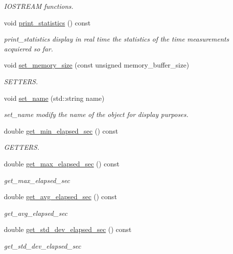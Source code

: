 \begin{DoxyCompactItemize}
\begin{DoxyCompactList}\small\item\em I\+O\+S\+T\+R\+E\+AM functions. \end{DoxyCompactList}\item 
\mbox{\label{classreal__time__tools_1_1Timer_a16635bb883c6f71772093a89cbe3130a}} 
void \hyperlink{classreal__time__tools_1_1Timer_a16635bb883c6f71772093a89cbe3130a}{print\+\_\+statistics} () const
\begin{DoxyCompactList}\small\item\em print\+\_\+statistics display in real time the statistics of the time measurements acquiered so far. \end{DoxyCompactList}\item 
void \hyperlink{classreal__time__tools_1_1Timer_a0319fbdc56fd5046d701c8728b27e860}{set\+\_\+memory\+\_\+size} (const unsigned memory\+\_\+buffer\+\_\+size)
\begin{DoxyCompactList}\small\item\em S\+E\+T\+T\+E\+RS. \end{DoxyCompactList}\item 
void \hyperlink{classreal__time__tools_1_1Timer_a1005cc3c2d7e68ab6d97c8d3167c7f93}{set\+\_\+name} (std\+::string name)
\begin{DoxyCompactList}\small\item\em set\+\_\+name modify the name of the object for display purposes. \end{DoxyCompactList}\item 
double \hyperlink{classreal__time__tools_1_1Timer_a167d5aa0ce706bc317999db70ff0f7cd}{get\+\_\+min\+\_\+elapsed\+\_\+sec} () const
\begin{DoxyCompactList}\small\item\em G\+E\+T\+T\+E\+RS. \end{DoxyCompactList}\item 
double \hyperlink{classreal__time__tools_1_1Timer_a18563032c4730c75cefba43e69d5aaa9}{get\+\_\+max\+\_\+elapsed\+\_\+sec} () const
\begin{DoxyCompactList}\small\item\em get\+\_\+max\+\_\+elapsed\+\_\+sec \end{DoxyCompactList}\item 
double \hyperlink{classreal__time__tools_1_1Timer_ac1be39401be7768a17cbe8388329f2fc}{get\+\_\+avg\+\_\+elapsed\+\_\+sec} () const
\begin{DoxyCompactList}\small\item\em get\+\_\+avg\+\_\+elapsed\+\_\+sec \end{DoxyCompactList}\item 
double \hyperlink{classreal__time__tools_1_1Timer_abc6382e906ae6f90582e0f7026e9dd76}{get\+\_\+std\+\_\+dev\+\_\+elapsed\+\_\+sec} () const
\begin{DoxyCompactList}\small\item\em get\+\_\+std\+\_\+dev\+\_\+elapsed\+\_\+sec \end{DoxyCompactList}\end{DoxyCompactItemize}
